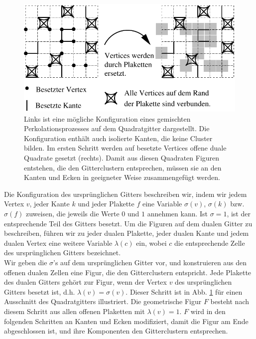 \begin{figure}[tbp]
  \centering
  \includegraphics{./Mixed-figs/mixed}
  \caption{Links ist eine m\"ogliche Konfiguration eines gemischten Perkolationsprozesses auf dem Quadratgitter dargestellt. Die Konfiguration enth\"alt auch isolierte Kanten, die keine Cluster bilden. Im ersten Schritt werden auf besetzte Vertices offene duale Quadrate gesetzt (rechts). Damit aus diesen Quadraten Figuren entstehen, die den Gitterclustern entsprechen, m\"ussen sie an den Kanten und Ecken in geeigneter Weise zusammengef\"ugt werden. }
  \label{fig:mixed}
\end{figure}
Die Konfiguration des urspr\"unglichen Gitters beschreiben wir, indem wir jedem Vertex $v$, jeder Kante $k$ und jeder Plakette $f$ eine Variable $\sigma(v)$, $\sigma(k)$ bzw. $\sigma(f)$ zuweisen, die jeweils die Werte $0$ und $1$ annehmen kann. Ist $\sigma=1$, ist der entsprechende Teil des Gitters besetzt. Um die Figuren auf dem dualen Gitter zu beschreiben, f\"uhren wir zu jeder dualen Plakette, jeder dualen Kante und jedem dualen Vertex eine weitere Variable $\lambda(c)$ ein, wobei $c$ die entsprechende Zelle des urspr\"unglichen Gitters bezeichnet.
\\Wir geben die $\sigma$'s auf dem urspr\"unglichen Gitter vor, und konstruieren aus den offenen dualen Zellen eine Figur, die den Gitterclustern entspricht. Jede Plakette des dualen Gitters geh\"ort zur Figur, wenn der Vertex $v$ des urspr\"unglichen Gitters besetzt ist, d.h. $\lambda(v)=\sigma(v)$. Dieser Schritt ist in Abb. \ref{fig:mixed} f\"ur einen Ausschnitt des Quadratgitters illustriert. Die geometrische Figur $F$ besteht nach diesem Schritt aus allen offenen Plaketten mit $\lambda(v)=1$. $F$ wird in den folgenden Schritten an Kanten und Ecken modifiziert, damit die Figur am Ende abgeschlossen ist, und ihre Komponenten den Gitterclustern entsprechen.
